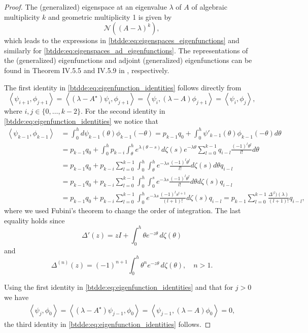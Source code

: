 \begin{proof}
The (generalized) eigenspace at an eigenvalue $\lambda$ of $A$ of algebraic multiplicity $k$ and geometric multiplicity 1 is given by 
\[
\mathcal{N}((A-\lambda)^k),
\]
which leads to the expressions in \cref{btdde:eq:eigenspaces_eigenfunctions} and similarly for \cref{btdde:eq:eigenspaces_ad_eigenfunctions}. The representations of the (generalized) eigenfunctions and adjoint (generalized) eigenfunctions can be found in Theorem IV.5.5 and IV.5.9 in \cite{diekmann1995delay}, respectively.

The first identity in \cref{btdde:eq:eigenfunction_identities} follows directly from
\[
    \left<\psi_{i + 1},\phi_{j + 1}\right> = \left<(\lambda-A^\star)\psi_i,\phi_{j + 1}\right>
    = \left<\psi_i,(\lambda-A)\phi_{j + 1}\right>
    = \left<\psi_i,\phi_j\right>,
\]
where $i,j\in\{0,\dots,k-2\}$.
For the second identity in \cref{btdde:eq:eigenfunction_identities} we notice that
\begin{align*}
    \left<\psi_{k-1},\phi_{k-1}\right> 
        &= \int_0^h d\psi_{k-1}(\theta) \phi_{k-1}(-\theta) 
         = p_{k-1}q_0 + \int_0^h \psi'_{k-1}(\theta) \phi_{k-1}(-\theta) d\theta \\
        &=  p_{k-1}q_0 + \int_0^h p_{k-i} \int_{\theta}^h e^{\lambda(\theta-s)} d\zeta(s) 
                e^{-\lambda\theta} \sum_{l=0}^{k-1} q_{i-l} \frac{(-1)^l\theta^l}{l!}d\theta \\
        &=  p_{k-1}q_0 + p_{k-i} \sum_{l=0}^{k-1} \int_0^h \int_{\theta}^h e^{-\lambda s}  
                \frac{(-1)^l\theta^l}{l!} d\zeta(s) d\theta  q_{i-l}\\
        &=  p_{k-1}q_0 + p_{k-i} \sum_{l=0}^{k-1} \int_0^h \int_0^s e^{-\lambda s}  
                \frac{(-1)^l\theta^l}{l!}d\theta  d\zeta(s) q_{i-l}\\
        &=  p_{k-1}q_0 + p_{k-i} \sum_{l=0}^{k-1} \int_0^h  e^{-\lambda s}  
            \frac{(-1)^l s^{l + 1}}{(l + 1)!} d\zeta(s) q_{i-l}
        = p_{k-1} \sum_{l=0}^{k-1} \frac{\Delta^{(l})(\lambda)}{(l + 1)!} q_{i-l},
\end{align*}
where we used Fubini\textquoteright s theorem to change the order of
integration. The last equality holds since
\[
\Delta'(z) =  zI + \int_0^h{\theta e^{-z\theta}\,d\zeta(\theta)} 
\]
and
\[
\Delta^{(n)}(z) =  (-1)^{n + 1}\int_0^h{\theta^n e^{-z\theta}\,d\zeta(\theta)}, \quad n > 1.
\]

Using the first identity in \cref{btdde:eq:eigenfunction_identities} and that for $j>0$ we have
\begin{align*}
    \left< \psi_j,\phi_0\right> = \left< (\lambda-A^\star)\psi_{j-1},\phi_0\right> 
                                = \left< \psi_{j-1},(\lambda-A)\phi_0\right> = 0,
\end{align*}
the third identity in \cref{btdde:eq:eigenfunction_identities} follows.


\end{proof}
